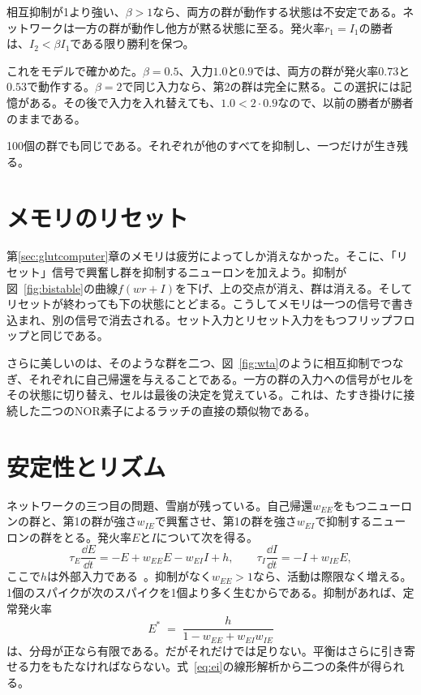 \begin{keyblock}
\begin{proposition}[勝者総取り]
\label{prop:wta}
相互抑制が1より強い、$\beta>1$なら、両方の群が動作する状態は不安定である。ネットワークは一方の群が動作し他方が黙る状態に至る。発火率$r_1=I_1$の勝者は、$I_2<\beta I_1$である限り勝利を保つ。
\end{proposition}
\end{keyblock}

これをモデルで確かめた。$\beta=0.5$、入力$1.0$と$0.9$では、両方の群が発火率$0.73$と$0.53$で動作する。$\beta=2$で同じ入力なら、第2の群は完全に黙る。この選択には記憶がある。その後で入力を入れ替えても、$1.0<2\cdot0.9$なので、以前の勝者が勝者のままである。

100個の群でも同じである。それぞれが他のすべてを抑制し、一つだけが生き残る。

\section{メモリのリセット}

第\ref{sec:glutcomputer}章のメモリは疲労によってしか消えなかった。そこに、「リセット」信号で興奮し群を抑制するニューロンを加えよう。抑制が図~\ref{fig:bistable}の曲線$f(wr+I)$を下げ、上の交点が消え、群は消える。そしてリセットが終わっても下の状態にとどまる。こうしてメモリは一つの信号で書き込まれ、別の信号で消去される。セット入力とリセット入力をもつフリップフロップと同じである。

さらに美しいのは、そのような群を二つ、図~\ref{fig:wta}のように相互抑制でつなぎ、それぞれに自己帰還を与えることである。一方の群の入力への信号がセルをその状態に切り替え、セルは最後の決定を覚えている。これは、たすき掛けに接続した二つのNOR素子によるラッチの直接の類似物である。

\section{安定性とリズム}

ネットワークの三つ目の問題、雪崩が残っている。自己帰還$w_{EE}$をもつニューロンの群と、第1の群が強さ$w_{IE}$で興奮させ、第1の群を強さ$w_{EI}$で抑制するニューロンの群をとる。発火率$E$と$I$について次を得る。
\begin{equation}
\tau_E\frac{\dd E}{\dd t} = -E + w_{EE}E - w_{EI}I + h, \qquad
\tau_I\frac{\dd I}{\dd t} = -I + w_{IE}E ,
\label{eq:ei}
\end{equation}
ここで$h$は外部入力である~\cite{WilsonCowan1972}。抑制がなく$w_{EE}>1$なら、活動は際限なく増える。1個のスパイクが次のスパイクを1個より多く生むからである。抑制があれば、定常発火率
\begin{equation}
E^* \;=\; \frac{h}{1-w_{EE}+w_{EI}w_{IE}}
\label{eq:eistar}
\end{equation}
は、分母が正なら有限である。だがそれだけでは足りない。平衡はさらに引き寄せる力をもたなければならない。式~\eqref{eq:ei}の線形解析から二つの条件が得られる。

